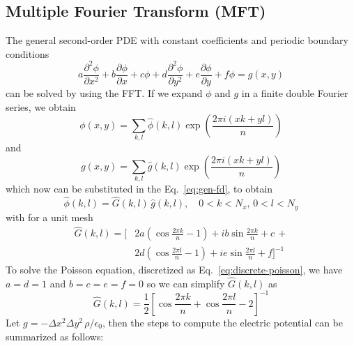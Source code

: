 \subsection{Multiple Fourier Transform (MFT)}

The general second-order PDE with constant coefficients and periodic boundary 
conditions
%
\begin{equation}%
\label{eq:gen-fd}
a \frac{\partial^2 \phi}{\partial x^2}+b\frac{\partial \phi}{\partial x}+c\phi +
d \frac{\partial^2 \phi}{\partial y^2}+e\frac{\partial \phi}{\partial y}+f\phi = 
g(x,y)
\end{equation}%
%
can be solved by using the FFT. If we expand $\phi$ and $g$ in a finite double 
Fourier series, we obtain
%
\begin{equation}%
\phi(x,y) = \sum_{k,l} \hat \phi(k, l) \exp\left({\frac{2\pi i (xk + 
yl)}{n}}\right)
\end{equation}%
%
and
%
\begin{equation}%
g(x,y) = \sum_{k,l} \hat g(k, l) \exp\left({\frac{2\pi i (xk + yl)}{n}}\right)
\end{equation}%
%
which now can be substituted in the Eq.~\ref{eq:gen-fd}, to obtain
%
\begin{equation}%
\hat \phi(k,l) = \hat G(k,l) \, \hat g(k,l),\quad 0<k<N_x,\,0<l<N_y
\end{equation}%
%
with for a unit mesh
%
\begin{equation}%
\begin{split}
\hat G(k,l) = \Bigg[
& 2a \left( \cos \frac{2\pi k}{n} - 1 \right) +
ib \sin \frac{2\pi k}{n} + c \,+ \\
& 2d \left( \cos \frac{2\pi l}{n} - 1 \right) +
ie \sin \frac{2\pi l}{n} + f
\Bigg]^{-1}
\end{split}
\end{equation}%
%
To solve the Poisson equation, discretized as Eq.~\ref{eq:discrete-poisson}, we 
have $a=d=1$ and $b=c=e=f=0$ so we can simplify $\hat G(k,l)$ as
%
\begin{equation}%
\hat G(k,l) = \frac{1}{2}\left[
\cos \frac{2\pi k}{n} +
\cos \frac{2\pi l}{n} -
2 \right]^{-1}
\end{equation}%
%
Let $g = -{\Delta x ^2 \Delta y^2\,\rho}/{\epsilon_0}$, then the steps to 
compute the electric potential can be summarized as follows:
%
\begin{center}%
\end{center}%
